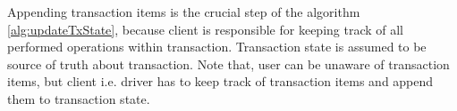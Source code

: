 Appending transaction items is the crucial step of the algorithm \ref{alg:updateTxState}, because client is responsible for keeping track of all performed operations within transaction. Transaction state is assumed to be source of truth about transaction.
Note that, user can be unaware of transaction items, but client i.e. driver has to keep track of transaction items and append them to transaction state.


